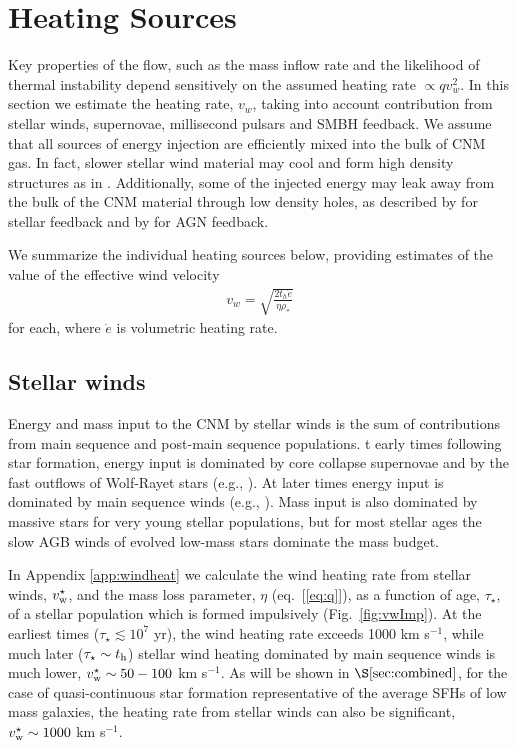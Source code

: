 \documentclass[usenatbib,fleqn]{mn2e}
\newcommand{\rhostar}{\rho_*}
\begin{document}
\section{Heating Sources}
\label{sec:heating}

Key properties of the flow, such as the mass inflow rate and the
likelihood of thermal instability depend sensitively on the assumed
heating rate $\propto qv_{w}^{2}$.  In this section we estimate the
heating rate, $v_w$, taking into account contribution from stellar
winds, supernovae, millisecond pulsars and SMBH feedback. We assume
that all sources of energy injection are efficiently mixed into the
bulk of CNM gas. In fact, slower stellar wind material may cool and
form high density structures as in \citet{Cuadra+2005}. Additionally,
some of the injected energy may leak away from the bulk of the CNM
material through low density holes, as described by
\citet{Harper-Clark+2009} for stellar feedback and by
\citet{Zubovas+2014} for AGN feedback.


We summarize the individual heating sources below, providing estimates
of the value of the effective wind velocity
\begin{align}
  v_{w} = \sqrt{\frac{2 t_h \dot{e}}{\eta \rhostar}}
  \label{eq:vw_eff}
\end{align}
for each, where $\dot{e}$ is volumetric heating rate.  

\subsection{Stellar winds} 

Energy and mass input to the CNM by stellar winds is the sum of
contributions from main sequence and post-main sequence populations.
t early times following star formation, energy input is dominated by
core collapse supernovae and by the fast outflows of Wolf-Rayet stars
(e.g., \citealt{VossDiehl+:2009a}).  At later times energy input is
dominated by main sequence winds (e.g.,
\citealt{NaimanSoares-Furtado+:2013a}).  Mass input is also dominated
by massive stars for very young stellar populations, but for most
stellar ages the slow AGB winds of evolved low-mass stars dominate the
mass budget.

In Appendix \ref{app:windheat} we calculate the wind heating rate from
stellar winds, $v_{\rm w}^{\star}$, and the mass loss parameter,
$\eta$ (eq.~[\ref{eq:q}]), as a function of age, $\tau_{\star}$, of a
stellar population which is formed impulsively (Fig.~\ref{fig:vwImp}).
At the earliest times ($\tau_{\star} \lesssim 10^{7}$ yr), the wind
heating rate exceeds 1000 km s$^{-1}$, while much later ($\tau_{\star}
\sim t_{\rm h}$) stellar wind heating dominated by main sequence winds
is much lower, $v^{\star}_{\rm w} \sim 50-100 $ km s$^{-1}$.  As will
be shown in $\S\ref{sec:combined}$, for the case of quasi-continuous
star formation representative of the average SFHs of low mass
galaxies, the heating rate from stellar winds can also be significant,
$v_{\rm w}^{\star} \sim 1000$ km s$^{-1}$.
\end{document}
